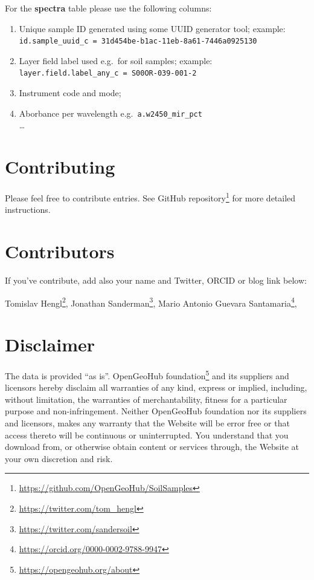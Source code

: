 \documentclass[
  graybox,natbib,nospthms]{svmono}
\providecommand{\tightlist}{%
  \setlength{\itemsep}{0pt}\setlength{\parskip}{0pt}}
\providecommand{\tightlist}{\setlength{\itemsep}{0pt}\setlength{\parskip}{0pt}}
\renewcommand{\href}[2]{#2 (\url{#1})}
\renewcommand{\href}[2]{#2\footnote{\url{#1}}}
\begin{document}
For the \textbf{spectra} table please use the following columns:

\begin{enumerate}
\def\labelenumi{\arabic{enumi}.}
\tightlist
\item
  Unique sample ID generated using some UUID generator tool; example: \texttt{id.sample\_uuid\_c\ =\ \textquotesingle{}31d454be-b1ac-11eb-8a61-7446a0925130\textquotesingle{}}\\
\item
  Layer field label used e.g.~for soil samples; example: \texttt{layer.field.label\_any\_c\ =\ \textquotesingle{}S00OR-039-001-2\textquotesingle{}}\\
\item
  Instrument code and mode;
\item
  Aborbance per wavelength e.g.~\texttt{a.w2450\_mir\_pct}\\
  \ldots{}\\
\end{enumerate}

\hypertarget{contributing}{%
\section{Contributing}\label{contributing}}

Please feel free to contribute entries. See \href{https://github.com/OpenGeoHub/SoilSamples}{GitHub
repository} for more detailed
instructions.

\hypertarget{contributors}{%
\section{Contributors}\label{contributors}}

If you've contribute, add also your name and Twitter, ORCID or blog link
below:

\href{https://twitter.com/tom_hengl}{Tomislav Hengl}, \href{https://twitter.com/sandersoil}{Jonathan Sanderman}, \href{https://orcid.org/0000-0002-9788-9947}{Mario Antonio Guevara
Santamaria},

\hypertarget{disclaimer}{%
\section{Disclaimer}\label{disclaimer}}

The data is provided ``as is''. \href{https://opengeohub.org/about}{OpenGeoHub foundation} and its suppliers and licensors hereby disclaim all warranties of any kind, express or implied, including, without limitation, the warranties of merchantability, fitness for a particular purpose and non-infringement. Neither OpenGeoHub foundation nor its suppliers and licensors, makes any warranty that the Website will be error free or that access thereto will be continuous or uninterrupted. You understand that you download from, or otherwise obtain content or services through, the Website at your own discretion and risk.
\end{document}

